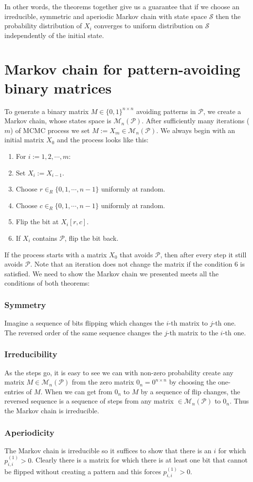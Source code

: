 In other words, the theorems together give us a guarantee that if we choose an irreducible, symmetric and aperiodic Markov chain with state space $\mathcal{S}$ then the probability distribution of $X_i$ converges to uniform distribution on $\mathcal{S}$ independently of the initial state.

\section{Markov chain for pattern-avoiding binary matrices}
\label{sect:mmcmc}
To generate a binary matrix $M\in\{0,1\}^{n\times n}$ avoiding patterns in $\mathcal{P}$, we create a Markov chain, whose states space is $\mathcal{M}_n(\mathcal{P})$. After sufficiently many iterations ($m$) of MCMC process we set $M:=X_m\in\mathcal{M}_n(\mathcal{P})$. We always begin with an initial matrix $X_0$ and the process looks like this:
\begin{enumerate}
\item For $i:=1,2,\cdots,m$:
\item \hspace{5mm} Set $X_{i}:=X_{i-1}$.
\item \hspace{5mm} Choose $r\in_R\{0,1,\cdots,n-1\}$ uniformly at random.
\item \hspace{5mm} Choose $c\in_R\{0,1,\cdots,n-1\}$ uniformly at random.
\item \hspace{5mm} Flip the bit at $X_{i}[r,c]$.
\item \hspace{5mm} If $X_{i}$ contains $\mathcal{P}$, flip the bit back.
\end{enumerate}

If the process starts with a matrix $X_0$ that avoids $\mathcal{P}$, then after every step it still avoids $\mathcal{P}$. Note that an iteration does not change the matrix if the condition 6 is satisfied. We need to show the Markov chain we presented meets all the conditions of both theorems:
\subsubsection{Symmetry}
Imagine a sequence of bits flipping which changes the $i$-th matrix to $j$-th one. The reversed order of the same sequence changes the $j$-th matrix to the $i$-th one.
\subsubsection{Irreducibility}
As the steps go, it is easy to see we can with non-zero probability create any matrix $M\in\mathcal{M}_n(\mathcal{P})$ from the zero matrix $0_n=0^{n\times n}$ by choosing the one-entries of $M$. When we can get from $0_n$ to $M$ by a sequence of flip changes, the reversed sequence is a sequence of steps from any matrix $\in\mathcal{M}_n(\mathcal{P})$ to $0_n$. Thus the Markov chain is irreducible.
\subsubsection{Aperiodicity}
The Markov chain is irreducible so it suffices to show that there is an $i$ for which $p_{i,i}^{(1)}>0$. Clearly there is a matrix for which there is at least one bit that cannot be flipped without creating a pattern and this forces $p_{i,i}^{(1)}>0$.